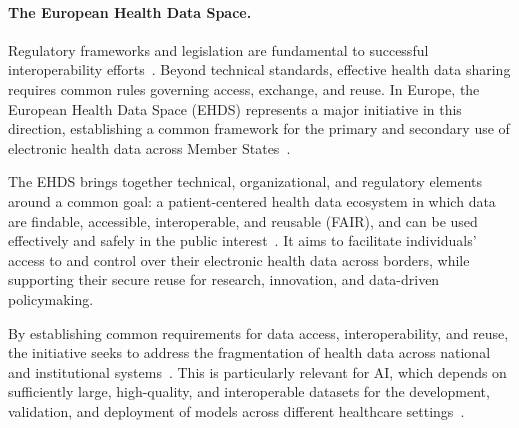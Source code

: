 \paragraph{The European Health Data Space.}

Regulatory frameworks and legislation are fundamental to successful interoperability efforts~\cite{oecd_interoperability_2026}. Beyond technical standards, effective health data sharing requires common rules governing access, exchange, and reuse. In Europe, the European Health Data Space (EHDS) represents a major initiative in this direction, establishing a common framework for the primary and secondary use of electronic health data across Member States~\cite{oecd_interoperability_2026}.

The EHDS brings together technical, organizational, and regulatory elements around a common goal: a patient-centered health data ecosystem in which data are findable, accessible, interoperable, and reusable (FAIR), and can be used effectively and safely in the public interest~\cite{oecd_interoperability_2026}. It aims to facilitate individuals' access to and control over their electronic health data across borders, while supporting their secure reuse for research, innovation, and data-driven policymaking.

By establishing common requirements for data access, interoperability, and reuse, the initiative seeks to address the fragmentation of health data across national and institutional systems~\cite{oecd_interoperability_2026}. This is particularly relevant for AI, which depends on sufficiently large, high-quality, and interoperable datasets for the development, validation, and deployment of models across different healthcare settings~\cite{oecd_progress_2026}.

